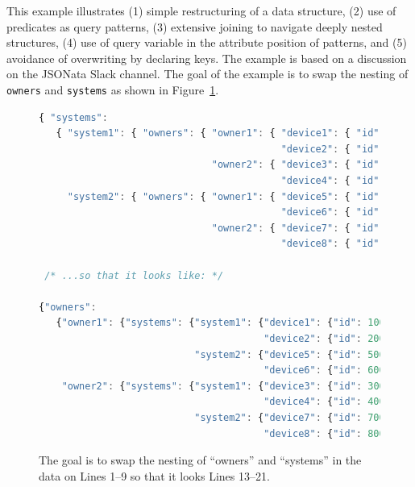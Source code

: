 \documentclass[10pt,letterpaper]{article} %
\newcommand{\stt}[1]{\texttt{#1}} %
\begin{document}
This example illustrates
(1) simple restructuring of a data structure,
(2) use of predicates as query patterns,
(3) extensive joining to navigate deeply nested structures,
(4) use of query variable in the attribute position of patterns, and
(5) avoidance of overwriting by declaring keys.
The example is based on a discussion on the JSONata Slack channel.
The goal of the example is to swap the nesting of \stt{owners} and \stt{systems} as shown in Figure~\ref{data:restruct}.

\begin{figure}[H]
  \caption{The goal is to swap the nesting of ``owners'' and ``systems'' in the data on Lines 1--9  so that it looks Lines 13--21.}
 \label{data:restruct}
\begin{lstlisting}[language=JavaScript,basicstyle=\ttfamily\scriptsize,numberstyle=\scriptsize]
{ "systems":
   { "system1": { "owners": { "owner1": { "device1": { "id": 100, "status": "Ok" },
                                          "device2": { "id": 200, "status": "Ok" }},
                              "owner2": { "device3": { "id": 300, "status": "Ok" },
                                          "device4": { "id": 400, "status": "Ok" }}}},
     "system2": { "owners": { "owner1": { "device5": { "id": 500, "status": "Ok" },
                                          "device6": { "id": 600, "status": "Ok" }},
                              "owner2": { "device7": { "id": 700, "status": "Ok" },
                                          "device8": { "id": 800, "status": "Ok" }}}}}}

 /* ...so that it looks like: */

{"owners":
   {"owner1": {"systems": {"system1": {"device1": {"id": 100, "status": "Ok"},
                                       "device2": {"id": 200, "status": "Ok"}},
                           "system2": {"device5": {"id": 500, "status": "Ok"},
                                       "device6": {"id": 600, "status": "Ok"}}},
    "owner2": {"systems": {"system1": {"device3": {"id": 300, "status": "Ok"},
                                       "device4": {"id": 400, "status": "Ok"}},
                           "system2": {"device7": {"id": 700, "status": "Ok"},
                                       "device8": {"id": 800, "status": "Ok"}}}}}))))
\end{lstlisting}
\end{figure} \vspace{-3em}
\end{document}

